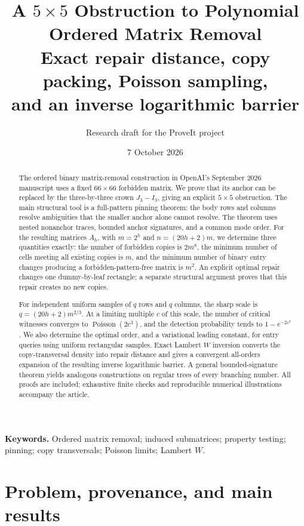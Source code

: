 \documentclass[11pt]{article}
\title{\color{ink}\textbf{A \(5\times5\) Obstruction to Polynomial\\Ordered Matrix Removal}\\[7pt]
\large Exact repair distance, copy packing, Poisson sampling,\\and an inverse logarithmic barrier}
\author{Research draft for the ProveIt project}
\date{7 October 2026}
\theoremstyle{definition}
\newcommand{\Poi}{\operatorname{Poisson}}
\begin{document}
\maketitle
\begin{abstract}
The ordered binary matrix-removal construction in OpenAI's September 2026
manuscript uses a fixed \(66\times66\) forbidden matrix. We prove that its
anchor can be replaced by the three-by-three crown \(J_3-I_3\), giving an
explicit \(5\times5\) obstruction. The main structural tool is a
full-pattern pinning theorem: the body rows and columns resolve ambiguities
that the smaller anchor alone cannot resolve. The theorem uses nested
nonanchor traces, bounded anchor signatures, and a common mode order.
For the resulting matrices \(A_h\), with
\(m=2^h\) and \(n=(20h+2)m\), we determine three quantities exactly:
the number of forbidden copies is \(2m^8\), the minimum number of cells
meeting all existing copies is \(m\), and the minimum number of binary
entry changes producing a forbidden-pattern-free matrix is \(m^2\).
An explicit optimal repair changes one dummy-by-leaf rectangle; a
separate structural argument proves that this repair creates no new copies.

For independent uniform samples of \(q\) rows and \(q\) columns, the sharp
scale is \(q=(20h+2)m^{2/3}\). At a limiting multiple \(c\) of this scale,
the number of critical witnesses converges to \(\Poi(2c^3)\), and the
detection probability tends to \(1-e^{-2c^3}\). We also determine the
optimal order, and a variational leading constant, for entry queries using
uniform rectangular samples. Exact Lambert \(W\) inversion converts the
copy-transversal density into repair distance and gives a convergent
all-orders expansion of the resulting inverse logarithmic barrier.
A general bounded-signature theorem yields analogous constructions on
regular trees of every branching number. All proofs are included;
exhaustive finite checks and reproducible numerical illustrations accompany
the article.
\end{abstract}
\vspace{4pt}
\noindent\textbf{Keywords.} Ordered matrix removal; induced submatrices;
property testing; pinning; copy transversals; Poisson limits; Lambert \(W\).
\newpage
\begingroup\small
\tableofcontents
\endgroup
\newpage

\section{Problem, provenance, and main results}
\label{sec:intro}
\end{document}
